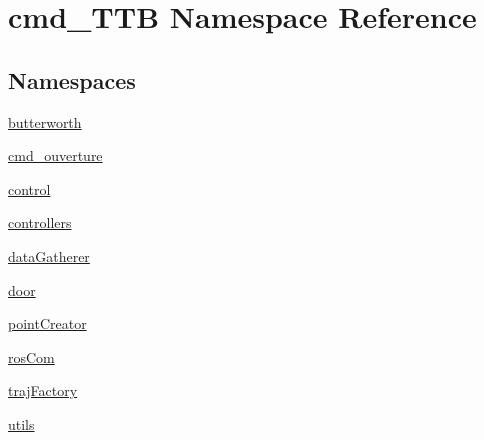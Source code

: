 \hypertarget{namespacecmd__TTB}{}\section{cmd\+\_\+\+T\+TB Namespace Reference}
\label{namespacecmd__TTB}
\subsection*{Namespaces}
\begin{DoxyCompactItemize}
\item 
 \hyperlink{namespacecmd__TTB_1_1butterworth}{butterworth}
\item 
 \hyperlink{namespacecmd__TTB_1_1cmd__ouverture}{cmd\+\_\+ouverture}
\item 
 \hyperlink{namespacecmd__TTB_1_1control}{control}
\item 
 \hyperlink{namespacecmd__TTB_1_1controllers}{controllers}
\item 
 \hyperlink{namespacecmd__TTB_1_1dataGatherer}{data\+Gatherer}
\item 
 \hyperlink{namespacecmd__TTB_1_1door}{door}
\item 
 \hyperlink{namespacecmd__TTB_1_1pointCreator}{point\+Creator}
\item 
 \hyperlink{namespacecmd__TTB_1_1rosCom}{ros\+Com}
\item 
 \hyperlink{namespacecmd__TTB_1_1trajFactory}{traj\+Factory}
\item 
 \hyperlink{namespacecmd__TTB_1_1utils}{utils}
\end{DoxyCompactItemize}
